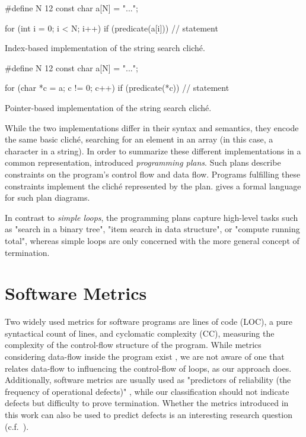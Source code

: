 \begin{listing}[H]
\begin{ccode}
#define N 12
const char a[N] = "...";

for (int i = 0; i < N; i++) {
    if (predicate(a[i])) {
        // statement
    }
}
\end{ccode}
\caption{Index-based implementation of the string search cliché.}
\label{lst:string_search_index}
\end{listing}

\begin{listing}[H]
\begin{ccode}
#define N 12
const char a[N] = "...";

for (char *c = a; c != 0; c++) {
    if (predicate(*c)) {
        // statement
    }
}
\end{ccode}
\caption{Pointer-based implementation of the string search cliché.}
\label{lst:string_search_pointer}
\end{listing}

While the two implementations differ in their syntax and semantics, they encode the same basic cliché, searching for an element in an array (in this case, a character in a string). In order to summarize these different implementations in a common representation, \citeauthor{DBLP:conf/ijcai/Rich81} \cite{DBLP:conf/ijcai/Rich81} introduced \emph{programming plans}. Such plans describe constraints on the program's control flow and data flow. Programs fulfilling these constraints implement the cliché represented by the plan. \citeauthor{DBLP:conf/ijcai/Rich81} \cite{DBLP:conf/ijcai/Rich81} gives a formal language for such plan diagrams.

In contrast to \emph{simple loops}, the programming plans capture high-level tasks such as "search in a binary tree", "item search in data structure", or "compute running total", whereas simple loops are only concerned with the more general concept of termination.

\section{Software Metrics}

Two widely used metrics for software programs are lines of code (LOC), a pure syntactical count of lines, and cyclomatic complexity (CC), measuring the complexity of the control-flow structure of the program. While metrics considering data-flow inside the program exist \cite{DBLP:journals/tse/HenryK81,DBLP:journals/tse/Weyuker88,DBLP:conf/iwpc/BeyerF10b}, we are not aware of one that relates data-flow to influencing the control-flow of loops, as our approach does. Additionally, software metrics are usually used as "predictors of reliability (the frequency of operational defects)" \cite{DBLP:journals/jss/FentonN99}, while our classification should not indicate defects but difficulty to prove termination. Whether the metrics introduced in this work can also be used to predict defects is an interesting research question (c.f.\ ). %

